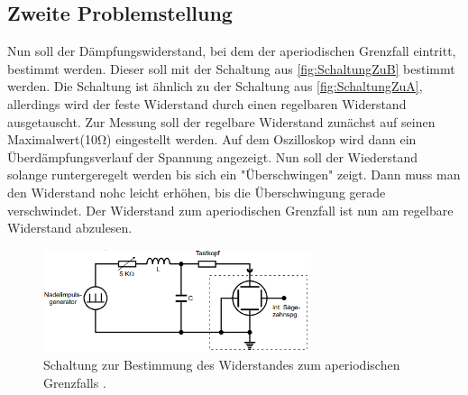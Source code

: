 \subsection{Zweite Problemstellung}
Nun soll der Dämpfungswiderstand, bei dem der aperiodischen Grenzfall eintritt, bestimmt werden. Dieser soll mit der Schaltung aus \autoref{fig:SchaltungZuB} bestimmt werden. 
Die Schaltung ist ähnlich zu der Schaltung aus \autoref{fig:SchaltungZuA}, allerdings wird der feste Widerstand durch einen regelbaren Widerstand ausgetauscht. Zur Messung 
soll der regelbare Widerstand zunächst auf seinen Maximalwert(10\unit{\ohm}) eingestellt werden. Auf dem Oszilloskop wird dann ein Überdämpfungsverlauf der Spannung angezeigt.
Nun soll der Wiederstand solange runtergeregelt werden bis sich ein "Überschwingen" zeigt. Dann muss man den Widerstand nohc leicht erhöhen, bis die Überschwingung gerade 
verschwindet. Der Widerstand zum aperiodischen Grenzfall ist nun am regelbare Widerstand abzulesen.
\begin{figure}
    \centering
    \includegraphics[width=0.7\textwidth]{content/SchaltungZuB.pdf}
    \caption{Schaltung zur Bestimmung des Widerstandes zum aperiodischen Grenzfalls \cite{v354}.}    
    \label{fig:SchaltungZuB}
\end{figure}
